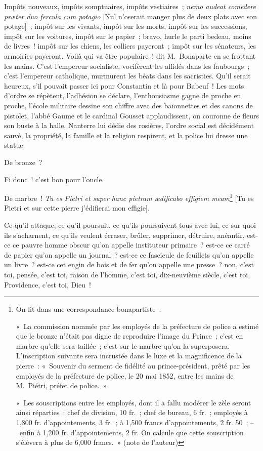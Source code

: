 \documentclass[french,twoside]{book} %
\begin{document}
Impôts nouveaux, impôts somptuaires, impôts vestiaires ; \emph{nemo audeat comedere præter duo fercula cum potagio} [Nul n’oserait manger plus de deux plats avec son potage] ; impôt sur les vivants, impôt sur les morts, impôt sur les successions, impôt sur les voitures, impôt sur le papier ; bravo, hurle le parti bedeau, moins de livres ! impôt sur les chiens, les colliers payeront ; impôt sur les sénateurs, les armoiries payeront. Voilà qui va être populaire ! dit M. Bonaparte en se frottant les mains. C’est l’empereur socialiste, vocifèrent les affidés dans les faubourgs ; c’est l’empereur catholique, murmurent les béats dans les sacristies. Qu’il serait heureux, s’il pouvait passer ici pour Constantin et là pour Babeuf ! Les mots d’ordre se répètent, l’adhésion se déclare, l’enthousiasme gagne de proche en proche, l’école militaire dessine son chiffre avec des baïonnettes et des canons de pistolet, l’abbé Gaume et le cardinal Gousset applaudissent, on couronne de fleurs son buste à la halle, Nanterre lui dédie des rosières, l’ordre social est décidément sauvé, la propriété, la famille et la religion respirent, et la police lui dresse une statue.\par
De bronze ?\par
Fi donc ! c’est bon pour l’oncle.\par
De marbre ! \emph{Tu es Pietri et super hanc pietram ædificabo effigiem meam}\footnote{ \noindent On lit dans une correspondance bonapartiste :\par
 « La commission nommée par les employés de la préfecture de police a estimé que le bronze n’était pas digne de reproduire l’image du Prince ; c’est en marbre qu’elle sera taillée ; c’est sur le marbre qu’on la superposera. L’inscription suivante sera incrustée dans le luxe et la magnificence de la pierre : « Souvenir du serment de fidélité au prince-président, prêté par les employés de la préfecture de police, le 20 mai 1852, entre les mains de M. Piétri, préfet de police. »\par
 « Les souscriptions entre les employés, dont il a fallu modérer le zèle seront ainsi réparties : chef de division, 10 fr. ; chef de bureau, 6 fr. ; employés à 1,800 fr. d’appointements, 3 fr. ; à 1,500 francs d’appointements, 2 fr. 50 ; – enfin à 1,200 fr. d’appointements, 2 fr. On calcule que cette souscription s’élèvera à plus de 6,000 francs. » (note de l’auteur)
} [Tu es Pietri et sur cette pierre j’édifierai mon effigie].\par
Ce qu’il attaque, ce qu’il poursuit, ce qu’ils poursuivent tous avec lui, ce sur quoi ils s’acharnent, ce qu’ils veulent écraser, brûler, supprimer, détruire, anéantir, est-ce ce pauvre homme obscur qu’on appelle instituteur primaire ? est-ce ce carré de papier qu’on appelle un journal ? est-ce ce fascicule de feuillets qu’on appelle un livre ? est-ce cet engin de bois et de fer qu’on appelle une presse ? non, c’est toi, pensée, c’est toi, raison de l’homme, c’est toi, dix-neuvième siècle, c’est toi, Providence, c’est toi, Dieu !\par
\end{document}
